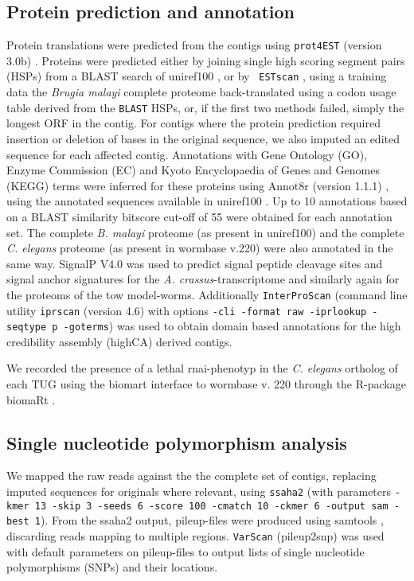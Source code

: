 \documentclass[10pt]{bmc_article}
\newenvironment{bmcformat}{\begin{raggedright}\baselineskip20pt\sloppy\setboolean{publ}{false}}{\end{raggedright}\baselineskip20pt\sloppy}
\begin{document}
\begin{bmcformat}
\subsection*{Protein prediction and annotation}

Protein translations were predicted from the contigs using
\texttt{prot4EST} (version 3.0b)
\cite{wasmuth_prot4est:_2004}. Proteins were predicted either by
joining single high scoring segment pairs (HSPs) from a BLAST search
of uniref100 \cite{pmid18836194}, or by \texttt{ ESTscan}
\cite{estscan}, using a training data the \textit{Brugia malayi}
complete proteome back-translated using a codon usage table derived
from the \texttt{BLAST} HSPs, or, if the first two methods failed,
simply the longest ORF in the contig. For contigs where the protein
prediction required insertion or deletion of bases in the original
sequence, we also imputed an edited sequence for each affected
contig. Annotations with Gene Ontology (GO), Enzyme Commission (EC)
and Kyoto Encyclopaedia of Genes and Genomes (KEGG) terms were
inferred for these proteins using Annot8r (version 1.1.1)
\cite{schmid_annot8r:_2008}, using the annotated sequences available
in uniref100 \cite{pmid18836194}. Up to 10 annotations based on a
BLAST similarity bitscore cut-off of 55 were obtained for each
annotation set. The complete \textit{B. malayi} proteome (as present
in uniref100) and the complete \textit{C. elegans} proteome (as
present in wormbase v.220) were also annotated in the same
way. SignalP V4.0 \cite{pmid21959131} was used to predict signal
peptide cleavage sites and signal anchor signatures for the
\textit{A. crassus}-transcriptome and similarly again for the proteoms
of the tow model-worms.  Additionally \texttt{InterProScan}
\cite{pmid11590104} (command line utility \texttt{iprscan} (version
4.6) with options \texttt{-cli -format raw -iprlookup -seqtype p
  -goterms}) was used to obtain domain based annotations for the high
credibility assembly (highCA) derived contigs.

We recorded the presence of a lethal rnai-phenotyp in the
\textit{C. elegans} ortholog of each TUG using the biomart
\cite{pmid22083790} interface to wormbase v. 220 through the R-package
biomaRt \cite{pmid19617889}.

\subsection*{Single nucleotide polymorphism analysis}

We mapped the raw reads against the the complete set of contigs,
replacing imputed sequences for originals where relevant, using
\texttt{ssaha2} \cite{pmid11591649} (with parameters \texttt{-kmer 13
  -skip 3 -seeds 6 -score 100 -cmatch 10 -ckmer 6 -output sam -best
  1}). From the ssaha2 output, pileup-files were produced using
samtools \cite{journals/bioinformatics/LiHWFRHMAD09}, discarding reads
mapping to multiple regions. \texttt{VarScan} \cite{pmid19542151}
(pileup2snp) was used with default parameters on pileup-files to
output lists of single nucleotide polymorphisms (SNPs) and their
locations.


\end{bmcformat}
\end{document}
